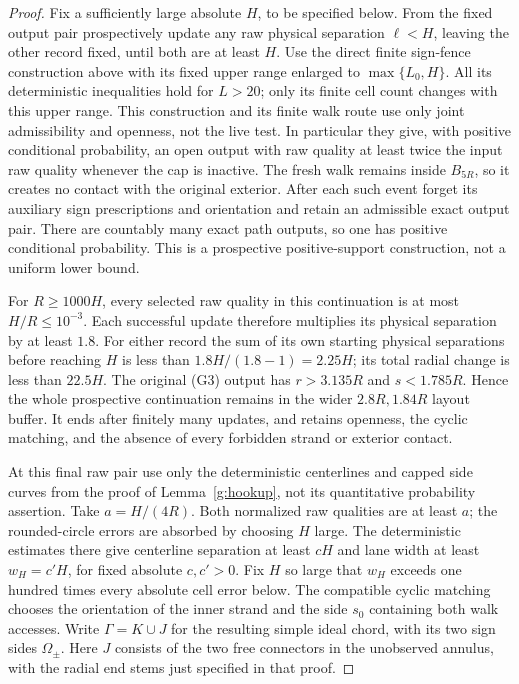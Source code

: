 \begin{proof}
Fix a sufficiently large absolute \(H\), to be specified below.  From
the fixed output pair prospectively update any raw physical separation
\(\ell<H\), leaving the other record fixed, until both are at least
\(H\).  Use the direct finite sign-fence construction above with its
fixed upper range enlarged to \(\max\{L_0,H\}\).  All its deterministic
inequalities hold for \(L>20\); only its finite cell count changes with
this upper range.  This construction and its finite walk route use only
joint admissibility and openness, not the live test.  In particular they
give, with positive conditional probability, an open output with raw
quality at least twice the input raw quality whenever the cap is inactive.
The fresh walk remains inside \(B_{5R}\), so it creates no contact with
the original exterior.  After each such event forget its auxiliary sign
prescriptions and orientation and retain an admissible exact output pair.
There are countably many exact path outputs, so one has positive
conditional probability.  This is a prospective positive-support
construction, not a uniform lower bound.

For \(R\ge1000H\), every selected raw quality in this continuation is
at most \(H/R\le10^{-3}\).  Each successful update therefore multiplies
its physical separation by at least \(1.8\).  For either record the sum
of its own starting physical separations before reaching \(H\) is less
than \(1.8H/(1.8-1)=2.25H\); its total radial change is less than
\(22.5H\).  The original (G3) output has \(r>3.135R\) and
\(s<1.785R\).  Hence the whole prospective continuation remains in the
wider \(2.8R,1.84R\) layout buffer.  It ends after finitely many updates,
and retains openness, the cyclic matching, and the absence of every
forbidden strand or exterior contact.

At this final raw pair use only the deterministic centerlines and capped
side curves from the proof of Lemma~\ref{g:hookup}, not its quantitative
probability assertion.  Take \(a=H/(4R)\).  Both normalized raw qualities
are at least \(a\); the rounded-circle errors are absorbed by choosing
\(H\) large.  The deterministic estimates there give centerline
separation at least \(cH\) and lane width at least \(w_H=c'H\), for
fixed absolute \(c,c'>0\).  Fix \(H\) so large that \(w_H\) exceeds one
hundred times every absolute cell error below.  The compatible cyclic
matching chooses the orientation of the inner strand and the side
\(s_0\) containing both walk accesses.  Write \(\Gamma=K\cup J\)
for the resulting simple ideal chord, with its two sign sides
\(\Omega_\pm\).  Here \(J\) consists of the two free connectors in
the unobserved annulus, with the radial end stems just specified in that
proof.


\end{proof}
